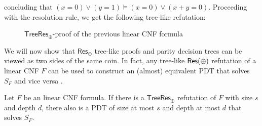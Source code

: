 concluding that $(x = 0) \lor (y = 1) \models (x = 0) \lor (x+y = 0)$. Proceeding with the resolution rule, we get the following tree-like refutation:
\begin{figure}[H]
    \centering
    

    \caption{$\mathsf{TreeRes}_\oplus$-proof of the previous linear CNF formula}
    \label{treelike_proof}
\end{figure}

We will now show that $\mathsf{Res}_\oplus$ tree-like proofs and parity decision trees can be viewed as two sides of the same coin. In fact, any tree-like $\mathsf{Res(\oplus)}$ refutation of a linear CNF $F$ can be used to construct an (almost) equivalent PDT that solves $S_F$ and vice versa \cite{res_lin_2}.

\begin{lemma}
    Let $F$ be an linear CNF formula. If there is a $\mathsf{TreeRes}_\oplus$ refutation of $F$ with size $s$ and depth $d$, there also is a PDT of size at most $s$ and depth at most $d$ that solves $S_F$.
\end{lemma}

